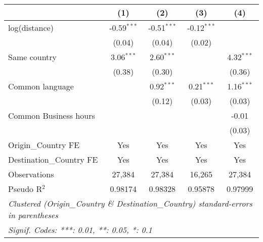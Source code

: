 
\begingroup
\centering
\small
\begin{tabular}{lcccc}
   \toprule
                            & (1)           & (2)           & (3)           & (4)\\  
   \midrule 
   log(distance)            & -0.59$^{***}$ & -0.51$^{***}$ & -0.12$^{***}$ &   \\   
                            & (0.04)        & (0.04)        & (0.02)        &   \\   
   Same country             & 3.06$^{***}$  & 2.60$^{***}$  &               & 4.32$^{***}$\\   
                            & (0.38)        & (0.30)        &               & (0.36)\\   
   Common language          &               & 0.92$^{***}$  & 0.21$^{***}$  & 1.16$^{***}$\\   
                            &               & (0.12)        & (0.03)        & (0.03)\\   
   Common Business hours    &               &               &               & -0.01\\   
                            &               &               &               & (0.03)\\   
   \midrule 
   Origin\_Country FE       & Yes           & Yes           & Yes           & Yes\\  
   Destination\_Country FE  & Yes           & Yes           & Yes           & Yes\\  
   \midrule 
   Observations             & 27,384        & 27,384        & 16,265        & 27,384\\  
   Pseudo R$^2$             & 0.98174       & 0.98328       & 0.95878       & 0.97999\\  
   \bottomrule
   \multicolumn{5}{l}{\emph{Clustered (Origin\_Country \& Destination\_Country) standard-errors in parentheses}}\\
   \multicolumn{5}{l}{\emph{Signif. Codes: ***: 0.01, **: 0.05, *: 0.1}}\\
\end{tabular}
\par\endgroup



